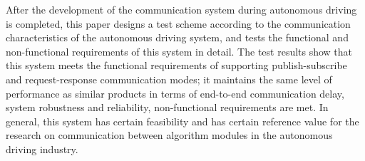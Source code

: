 \begin{abstract*}
  After the development of the communication system during autonomous driving is completed, 
  this paper designs a test scheme according to the communication characteristics of the autonomous driving system, 
  and tests the functional and non-functional requirements of this system in detail. 
  The test results show that this system meets the functional requirements of supporting publish-subscribe and request-response communication modes; it maintains the same level of performance as similar products in terms of end-to-end communication delay, 
  system robustness and reliability, non-functional requirements are met. 
  In general, this system has certain feasibility and has certain reference value for the research on communication between algorithm modules in the autonomous driving industry.
\end{abstract*}
